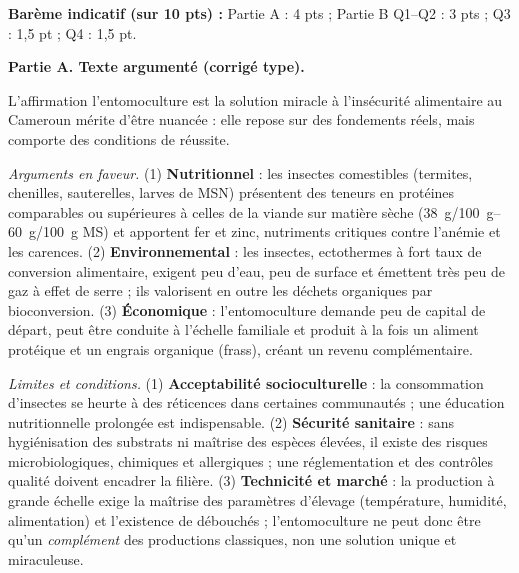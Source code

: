 \documentclass[11pt]{article}
\begin{document}
\begin{corrige}
\textbf{Barème indicatif (sur 10 pts) :} Partie A : 4 pts ; Partie B Q1--Q2 : 3 pts ; Q3 : 1,5 pt ; Q4 : 1,5 pt.

\textbf{Partie A. Texte argumenté (corrigé type).}

L'affirmation \og l'entomoculture est la solution miracle à l'insécurité alimentaire au Cameroun \fg{} mérite d'être nuancée : elle repose sur des fondements réels, mais comporte des conditions de réussite.

\emph{Arguments en faveur.} (1) \textbf{Nutritionnel} : les insectes comestibles (termites, chenilles, sauterelles, larves de MSN) présentent des teneurs en protéines comparables ou supérieures à celles de la viande sur matière sèche (\SIrange{38}{60}{g/100 g} MS) et apportent fer et zinc, nutriments critiques contre l'anémie et les carences. (2) \textbf{Environnemental} : les insectes, ectothermes à fort taux de conversion alimentaire, exigent peu d'eau, peu de surface et émettent très peu de gaz à effet de serre ; ils valorisent en outre les déchets organiques par bioconversion. (3) \textbf{Économique} : l'entomoculture demande peu de capital de départ, peut être conduite à l'échelle familiale et produit à la fois un aliment protéique et un engrais organique (frass), créant un revenu complémentaire.

\emph{Limites et conditions.} (1) \textbf{Acceptabilité socioculturelle} : la consommation d'insectes se heurte à des réticences dans certaines communautés ; une éducation nutritionnelle prolongée est indispensable. (2) \textbf{Sécurité sanitaire} : sans hygiénisation des substrats ni maîtrise des espèces élevées, il existe des risques microbiologiques, chimiques et allergiques ; une réglementation et des contrôles qualité doivent encadrer la filière. (3) \textbf{Technicité et marché} : la production à grande échelle exige la maîtrise des paramètres d'élevage (température, humidité, alimentation) et l'existence de débouchés ; l'entomoculture ne peut donc être qu'un \emph{complément} des productions classiques, non une solution unique et miraculeuse.


\end{corrige}
\end{document}
